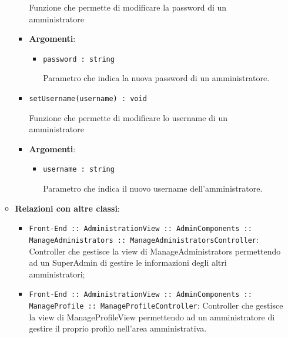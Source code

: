 \documentclass[../DefinizioneDiProdotto.tex]{subfiles}
\begin{document}
\begin{itemize}
\begin{itemize}
\begin{itemize}
	 Funzione che permette di modificare la password di un amministratore

	\item \textbf{Argomenti}:
	\begin{itemize}
	\item \texttt{password : string}\

	 Parametro che indica la nuova password di un amministratore.
	\end{itemize}
	\end{itemize}\vspace{0.5em}
	\begin{itemize}
	\item \texttt{setUsername(username) : void}\

	 Funzione che permette di modificare lo username di un amministratore

	\item \textbf{Argomenti}:
	\begin{itemize}
	\item \texttt{username : string}\

	 Parametro che indica il nuovo username dell'amministratore.
	\end{itemize}
	\end{itemize}\vspace{0.5em}
	\item \textbf{Relazioni con altre classi}:
	\begin{itemize}
	\item \texttt{Front-End :: AdministrationView :: AdminComponents :: ManageAdministrators :: ManageAdministratorsController}: Controller che gestisce la view di ManageAdministrators permettendo ad un SuperAdmin di gestire le informazioni degli altri amministratori;
	\item \texttt{Front-End :: AdministrationView :: AdminComponents :: ManageProfile :: ManageProfileController}: Controller che gestisce la view di ManageProfileView permettendo ad un amministratore di gestire il proprio profilo nell'area amministrativa.
	\end{itemize}

	\end{itemize}

	\newpage

\end{itemize}
\end{document}

